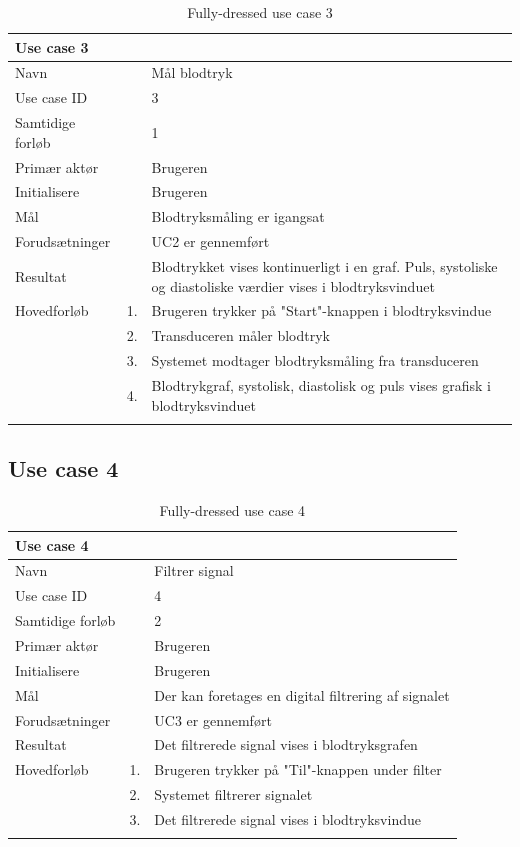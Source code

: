 \begin{longtabu} to  %
    {\large \textbf{Use case 3}} && \\
    \toprule
    Navn &&    Mål blodtryk\\
    Use case ID &&    3\\
    Samtidige forløb &&    1\\
    Primær aktør &&    Brugeren\\
    Initialisere &&    Brugeren\\
    Mål && Blodtryksmåling er igangsat\\
    Forudsætninger && UC2 er gennemført\\
    Resultat &&    Blodtrykket vises kontinuerligt i en graf. Puls, systoliske og diastoliske værdier vises i blodtryksvinduet                 \\ \midrule
    Hovedforløb &    1. &    Brugeren trykker på "Start"\--knappen i blodtryksvindue\\
    			& 	 2. & Transduceren måler blodtryk\\
    			&	 3. & Systemet modtager blodtryksmåling fra transduceren\\
    			& 	 4. & Blodtrykgraf, systolisk, diastolisk og puls vises grafisk i blodtryksvinduet\\  \bottomrule
\caption{Fully-dressed use case 3}
\label{UC3}
\end{longtabu}

\subsection{Use case 4}

\begin{longtabu} to  %
    {\large \textbf{Use case 4}} && \\
    \toprule
    Navn &&    Filtrer signal\\
    Use case ID &&    4\\
    Samtidige forløb &&    2\\
    Primær aktør &&    Brugeren\\
    Initialisere &&    Brugeren\\
    Mål && Der kan foretages en digital filtrering af signalet\\
    Forudsætninger && UC3 er gennemført\\
    Resultat &&    Det filtrerede signal vises i blodtryksgrafen                    \\ \midrule
    Hovedforløb &    1. &    Brugeren trykker på "Til"\--knappen under filter\\
    			&	 2. & 	 Systemet filtrerer signalet\\
    			&	 3. 	&	 Det filtrerede signal vises i blodtryksvindue \\ \bottomrule               
\caption{Fully-dressed use case 4}
\label{UC4}
\end{longtabu}

